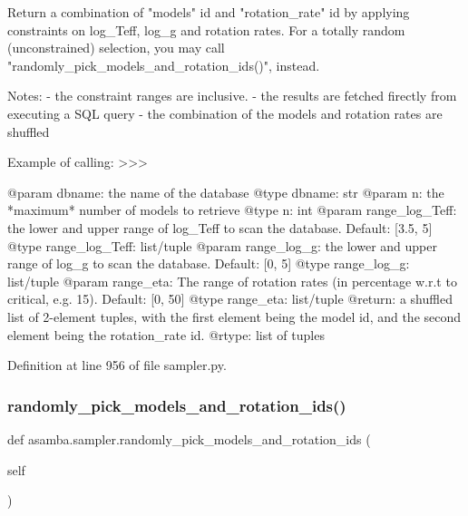 \begin{DoxyVerb}Return a combination of "models" id and "rotation_rate" id by applying constraints on log_Teff,
log_g and rotation rates. For a totally random (unconstrained) 
selection, you may call "randomly_pick_models_and_rotation_ids()", instead. 

Notes:
- the constraint ranges are inclusive. 
- the results are fetched firectly from executing a SQL query
- the combination of the models and rotation rates are shuffled

Example of calling:
>>>

@param dbname: the name of the database
@type dbname: str
@param n: the *maximum* number of models to retrieve
@type n: int
@param range_log_Teff: the lower and upper range of log_Teff to scan the database. Default: [3.5, 5]
@type range_log_Teff: list/tuple
@param range_log_g: the lower and upper range of log_g to scan the database. Default: [0, 5]
@type range_log_g: list/tuple
@param range_eta: The range of rotation rates (in percentage w.r.t to critical, e.g. 15). 
       Default: [0, 50]
@type range_eta: list/tuple
@return: a shuffled list of 2-element tuples, with the first element being the model id, and the
       second element being the rotation_rate id.
@rtype: list of tuples
\end{DoxyVerb}
 

Definition at line 956 of file sampler.\+py.

\mbox{\label{namespaceasamba_1_1sampler_a75d171190ae15adb0e2c6fabf2c04e7a}} 
\subsubsection{\texorpdfstring{randomly\+\_\+pick\+\_\+models\+\_\+and\+\_\+rotation\+\_\+ids()}{randomly\_pick\_models\_and\_rotation\_ids()}}
{\footnotesize\ttfamily def asamba.\+sampler.\+randomly\+\_\+pick\+\_\+models\+\_\+and\+\_\+rotation\+\_\+ids (\begin{DoxyParamCaption}\item[{}]{self }\end{DoxyParamCaption})}

